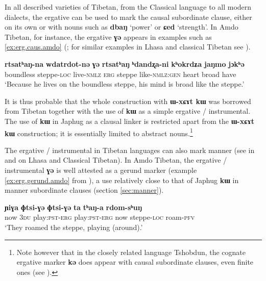 \documentclass[oldfontcommands,oneside,a4paper,11pt]{article}
\newcommand{\ipa}[1]{{\phon\textbf{#1}}}
\begin{document}
In all described varieties of Tibetan, from the Classical language to all modern dialects, the ergative can be used to mark the causal subordinate clause, either on its own or with nouns such as \ipa{dbaŋ} `power' or \ipa{ɕed} `strength'. In Amdo Tibetan, for instance, the ergative \ipa{ɣə} appears in examples such as \ref{ex:erg.caus.amdo} (\citealt[271-272]{vbrugmo03maqu}; for similar examples in Lhasa and classical Tibetan see \citealt[129]{tournadre96erg}).
 \begin{exe} 
\ex \label{ex:erg.caus.amdo}
\gll  \ipa{kʰokjaŋwi} 	\ipa{rtsatʰaŋ-na} 	\ipa{wdatrdot-nə} 	\ipa{ɣə} 	\ipa{rtsatʰaŋ} 	\ipa{ʰdandʐa-ni} 	\ipa{kʰokrdʑa} 	\ipa{jaŋmo} 	\ipa{jɔkʰə}  \\
boundless steppe-\textsc{loc} live-\textsc{nmlz} \textsc{erg} steppe like-\textsc{nmlz:gen} heart broad have \\
\glt  `Because he lives on the boundless steppe, his mind is broad like the steppe.'
\end{exe}  
 
It is thus probable that the whole construction with \ipa{ɯ-xɕɤt kɯ} was borrowed from Tibetan together with the use of \ipa{kɯ} as a simple ergative / instrumental. The use of  \ipa{kɯ} in Japhug as a clausal linker is restricted apart from the  \ipa{ɯ-xɕɤt kɯ} construction; it is essentially limited to  abstract nouns.\footnote{Note however that in the closely related language Tshobdun, the cognate ergative marker \ipa{kə} does appear with causal subordinate clauses, even finite ones (see \citealt[479]{sun12complementation}).}

The ergative / instrumental in Tibetan languages can also mark manner (see in  \citealt[128]{tournadre96erg} and \citet{tournadre10cases} on Lhasa and Classical Tibetan). In Amdo Tibetan, the ergative / instrumental \ipa{ɣə} is well attested as a gerund marker (example \ref{ex:erg.gerund.amdo} from \citealt[162; 167]{haller04themchen}), a use relatively close to that of Japhug \ipa{kɯ} in manner subordinate clauses (section \ref{sec:manner}).

 \begin{exe} 
\ex \label{ex:erg.gerund.amdo}
\gll   \ipa{ta} 	\ipa{ɲiɣa} 	\ipa{ɸtsi-ɣə} 	\ipa{ɸtsi-ɣə} 	\ipa{ta} 	\ipa{tʰaŋ-a} 	\ipa{rdom-sʰuŋ}  \\
now \textsc{3du} play:\textsc{pst}-\textsc{erg} play:\textsc{pst}-\textsc{erg} now steppe-\textsc{loc} roam-\textsc{pfv} \\
\glt  `They roamed the steppe, playing (around).'
\end{exe}  
\end{document}
